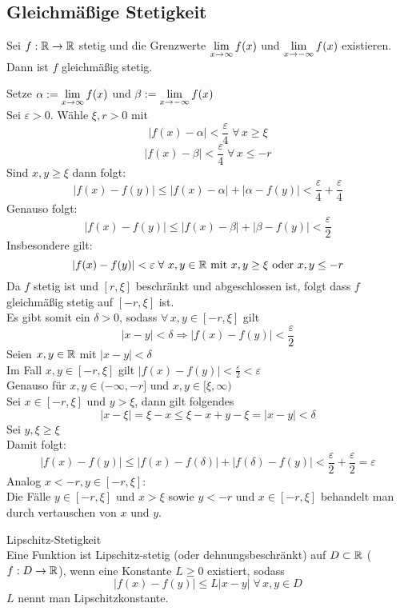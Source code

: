 \documentclass[../ana1u.tex]{subfiles}
\begin{document}
\subsection{Gleichmäßige Stetigkeit}
\begin{beh}
    Sei \(f:\mathbb{R} \rightarrow \mathbb{R} \) stetig und die Grenzwerte \(\lim\limits_{x\rightarrow\infty} f(x)\) und 
    \(\lim\limits_{x\rightarrow -\infty} f(x) \) existieren. \\
    Dann ist \(f\) gleichmäßig stetig.
\end{beh}
\begin{bew}
    Setze \(\alpha := \lim\limits_{x\rightarrow\infty} f(x) \) und \(\beta := \lim\limits_{x\rightarrow -\infty} f(x) \) \\
    Sei \(\varepsilon > 0 \). Wähle \(\xi, r > 0 \) mit
    \[|f(x) - \alpha| < \frac{\varepsilon}{4} \; \forall \, x \geq \xi \]
    \[|f(x) - \beta| < \frac{\varepsilon}{4} \; \forall \, x \leq -r \]
    Sind \(x,y \geq \xi \) dann folgt:
    \[|f(x)-f(y)| \leq |f(x) - \alpha| + |\alpha - f(y)| < \frac{\varepsilon}{4} + \frac{\varepsilon}{4} \]
    Genauso folgt:
    \[|f(x)-f(y)| \leq |f(x)-\beta| + |\beta-f(y)| < \frac{\varepsilon}{2} \]
    Insbesondere gilt:
    \[|f(x)-f(y)| < \varepsilon \; \forall \, x,y \in \R \text{ mit } x,y \geq \xi \text{ oder } x,y \leq -r \]
    Da \(f\) stetig ist und \([r, \xi] \) beschränkt und abgeschlossen ist, folgt dass \(f\) gleichmäßig
    stetig auf \([-r,\xi] \) ist. \\
    Es gibt somit ein \(\delta > 0 \), sodass \(\forall \, x,y \in [-r, \xi] \) gilt
    \[|x-y| < \delta \Rightarrow |f(x)-f(y)| < \frac{\varepsilon}{2} \]
    Seien \(x,y \in \mathbb{R} \) mit \(|x-y| < \delta \) \\
    Im Fall \(x,y \in [-r, \xi] \) gilt \(|f(x)-f(y)| < \frac{\varepsilon}{2} < \varepsilon \) \\
    Genauso für \(x,y \in (-\infty, -r] \) und \(x,y \in [\xi, \infty) \) \\
    Sei \(x \in [-r, \xi] \) und \(y > \xi \), dann gilt folgendes 
    \[|x-\xi| = \xi - x \leq \xi - x+y - \xi = |x-y| < \delta \]
    Sei \(y, \xi \geq \xi \) \\
    Damit folgt:
    \[|f(x)-f(y)| \leq |f(x)-f(\delta)| + |f(\delta)-f(y)| < \frac{\varepsilon}{2} + \frac{\varepsilon}{2}
    = \varepsilon \]
    Analog \(x < -r, y \in [-r,\xi] \): \\
    Die Fälle \(y \in [-r, \xi] \) und \(x > \xi \) sowie \(y < -r \) und \(x \in [-r, \xi] \) behandelt
    man durch vertauschen von \(x \) und \(y \).
\end{bew}
\begin{defi*}
    Lipschitz-Stetigkeit \\
    Eine Funktion ist Lipschitz-stetig (oder dehnungsbeschränkt) auf \(D \subset \mathbb{R} \) (\(f:D \rightarrow \mathbb{R} \)),
    wenn eine Konstante \(L \geq 0 \) existiert, sodass
    \[|f(x)-f(y)| \leq L|x-y| \; \forall \, x,y \in D \]
    \(L \) nennt man Lipschitzkonstante.
\end{defi*}
\end{document}
